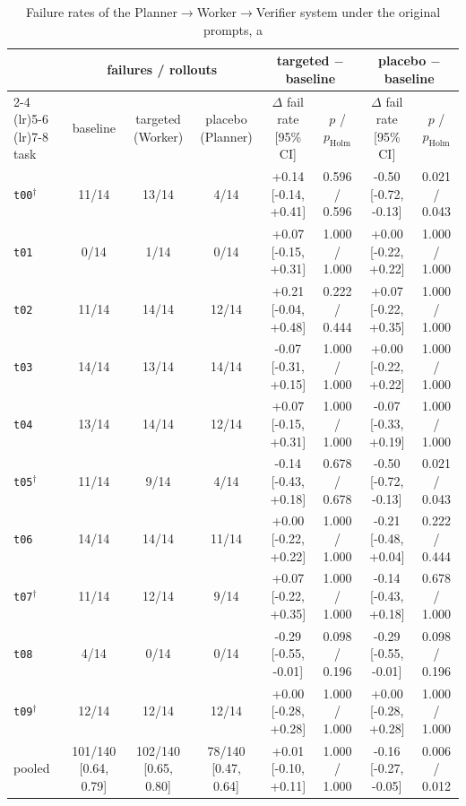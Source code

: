 \begin{table}[t]
\centering\scriptsize
\begin{tabular}{lccccccc}
\toprule
 & \multicolumn{3}{c}{failures / rollouts} & \multicolumn{2}{c}{targeted $-$ baseline} & \multicolumn{2}{c}{placebo $-$ baseline} \\
\cmidrule(lr){2-4} \cmidrule(lr){5-6} \cmidrule(lr){7-8}
task & baseline & targeted (Worker) & placebo (Planner) & $\Delta$ fail rate [95\% CI] & $p$ / $p_{\mathrm{Holm}}$ & $\Delta$ fail rate [95\% CI] & $p$ / $p_{\mathrm{Holm}}$ \\
\midrule
\texttt{t00}$^\dagger$ & 11/14 & 13/14 & 4/14 & +0.14 [-0.14, +0.41] & 0.596 / 0.596 & -0.50 [-0.72, -0.13] & 0.021 / 0.043 \\
\texttt{t01} & 0/14 & 1/14 & 0/14 & +0.07 [-0.15, +0.31] & 1.000 / 1.000 & +0.00 [-0.22, +0.22] & 1.000 / 1.000 \\
\texttt{t02} & 11/14 & 14/14 & 12/14 & +0.21 [-0.04, +0.48] & 0.222 / 0.444 & +0.07 [-0.22, +0.35] & 1.000 / 1.000 \\
\texttt{t03} & 14/14 & 13/14 & 14/14 & -0.07 [-0.31, +0.15] & 1.000 / 1.000 & +0.00 [-0.22, +0.22] & 1.000 / 1.000 \\
\texttt{t04} & 13/14 & 14/14 & 12/14 & +0.07 [-0.15, +0.31] & 1.000 / 1.000 & -0.07 [-0.33, +0.19] & 1.000 / 1.000 \\
\texttt{t05}$^\dagger$ & 11/14 & 9/14 & 4/14 & -0.14 [-0.43, +0.18] & 0.678 / 0.678 & -0.50 [-0.72, -0.13] & 0.021 / 0.043 \\
\texttt{t06} & 14/14 & 14/14 & 11/14 & +0.00 [-0.22, +0.22] & 1.000 / 1.000 & -0.21 [-0.48, +0.04] & 0.222 / 0.444 \\
\texttt{t07}$^\dagger$ & 11/14 & 12/14 & 9/14 & +0.07 [-0.22, +0.35] & 1.000 / 1.000 & -0.14 [-0.43, +0.18] & 0.678 / 1.000 \\
\texttt{t08} & 4/14 & 0/14 & 0/14 & -0.29 [-0.55, -0.01] & 0.098 / 0.196 & -0.29 [-0.55, -0.01] & 0.098 / 0.196 \\
\texttt{t09}$^\dagger$ & 12/14 & 12/14 & 12/14 & +0.00 [-0.28, +0.28] & 1.000 / 1.000 & +0.00 [-0.28, +0.28] & 1.000 / 1.000 \\
\midrule
pooled & 101/140 [0.64, 0.79] & 102/140 [0.65, 0.80] & 78/140 [0.47, 0.64] & +0.01 [-0.10, +0.11] & 1.000 / 1.000 & -0.16 [-0.27, -0.05] & 0.006 / 0.012 \\
\bottomrule
\end{tabular}
\caption{Failure rates of the Planner$\to$Worker$\to$Verifier system under the original prompts, a
}
\end{table}
